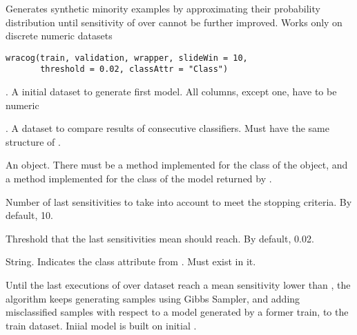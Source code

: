 %
\begin{Description}\relax
Generates synthetic minority examples by approximating their probability
distribution until sensitivity of  over 
cannot be further improved. Works only on discrete numeric datasets
\end{Description}
%
\begin{Usage}
\begin{verbatim}
wracog(train, validation, wrapper, slideWin = 10, 
       threshold = 0.02, classAttr = "Class")
\end{verbatim}
\end{Usage}
%
\begin{Arguments}
\begin{ldescription}
\item[\code{train}] . A initial dataset to generate first model.
All columns, except  one, have to be numeric

\item[\code{validation}] . A dataset to compare results of
consecutive classifiers. Must have the same structure of .

\item[\code{wrapper}] An  object. There must be a method
 implemented for the class of the object, and a
 method implemented for the class of the model
returned by .

\item[\code{slideWin}] Number of last sensitivities to take into account to meet the
stopping criteria. By default, 10.

\item[\code{threshold}] Threshold that the last  sensitivities mean
should reach. By default, 0.02.

\item[\code{classAttr}] String. Indicates the class attribute from .
Must exist in it.
\end{ldescription}
\end{Arguments}
%
\begin{Details}\relax
Until the last  executions of  over
 dataset reach a mean sensitivity lower than
, the algorithm keeps generating samples using Gibbs Sampler,
and adding misclassified samples with respect to a model generated by a
former train, to the train dataset. Iniial model is built on initial
.
\end{Details}
